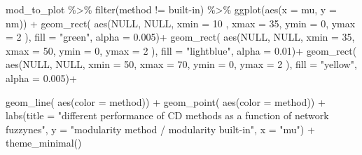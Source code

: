 \documentclass[
]{article}
\newenvironment{Shaded}{\begin{snugshade}}{\end{snugshade}}
\newcommand{\AttributeTok}[1]{\textcolor[rgb]{0.77,0.63,0.00}{#1}}
\newcommand{\ConstantTok}[1]{\textcolor[rgb]{0.00,0.00,0.00}{#1}}
\newcommand{\DecValTok}[1]{\textcolor[rgb]{0.00,0.00,0.81}{#1}}
\newcommand{\FloatTok}[1]{\textcolor[rgb]{0.00,0.00,0.81}{#1}}
\newcommand{\FunctionTok}[1]{\textcolor[rgb]{0.00,0.00,0.00}{#1}}
\newcommand{\NormalTok}[1]{#1}
\newcommand{\SpecialCharTok}[1]{\textcolor[rgb]{0.00,0.00,0.00}{#1}}
\newcommand{\StringTok}[1]{\textcolor[rgb]{0.31,0.60,0.02}{#1}}
\begin{document}
\begin{Shaded}
\begin{Highlighting}[]
\NormalTok{mod\_to\_plot }\SpecialCharTok{\%\textgreater{}\%} \FunctionTok{filter}\NormalTok{(method }\SpecialCharTok{!=} \StringTok{\textquotesingle{}built{-}in\textquotesingle{}}\NormalTok{) }\SpecialCharTok{\%\textgreater{}\%}
  \FunctionTok{ggplot}\NormalTok{(}\FunctionTok{aes}\NormalTok{(}\AttributeTok{x =}\NormalTok{ mu, }\AttributeTok{y =}\NormalTok{ nm)) }\SpecialCharTok{+}
  \FunctionTok{geom\_rect}\NormalTok{( }\FunctionTok{aes}\NormalTok{(}\ConstantTok{NULL}\NormalTok{, }\ConstantTok{NULL}\NormalTok{, }\AttributeTok{xmin =} \DecValTok{10}\NormalTok{ , }\AttributeTok{xmax =} \DecValTok{35}\NormalTok{, }\AttributeTok{ymin =} \DecValTok{0}\NormalTok{, }\AttributeTok{ymax =} \DecValTok{2}\NormalTok{ ), }\AttributeTok{fill =} \StringTok{"green"}\NormalTok{, }\AttributeTok{alpha =} \FloatTok{0.005}\NormalTok{)}\SpecialCharTok{+}
  \FunctionTok{geom\_rect}\NormalTok{( }\FunctionTok{aes}\NormalTok{(}\ConstantTok{NULL}\NormalTok{, }\ConstantTok{NULL}\NormalTok{, }\AttributeTok{xmin =} \DecValTok{35}\NormalTok{, }\AttributeTok{xmax =} \DecValTok{50}\NormalTok{, }\AttributeTok{ymin =} \DecValTok{0}\NormalTok{, }\AttributeTok{ymax =} \DecValTok{2}\NormalTok{ ), }\AttributeTok{fill =} \StringTok{"lightblue"}\NormalTok{, }\AttributeTok{alpha =} \FloatTok{0.01}\NormalTok{)}\SpecialCharTok{+}
  \FunctionTok{geom\_rect}\NormalTok{( }\FunctionTok{aes}\NormalTok{(}\ConstantTok{NULL}\NormalTok{, }\ConstantTok{NULL}\NormalTok{, }\AttributeTok{xmin =} \DecValTok{50}\NormalTok{, }\AttributeTok{xmax =} \DecValTok{70}\NormalTok{, }\AttributeTok{ymin =} \DecValTok{0}\NormalTok{, }\AttributeTok{ymax =} \DecValTok{2}\NormalTok{ ), }\AttributeTok{fill =} \StringTok{"yellow"}\NormalTok{, }\AttributeTok{alpha =} \FloatTok{0.005}\NormalTok{)}\SpecialCharTok{+}

  \FunctionTok{geom\_line}\NormalTok{( }\FunctionTok{aes}\NormalTok{(}\AttributeTok{color =}\NormalTok{ method)) }\SpecialCharTok{+}
  \FunctionTok{geom\_point}\NormalTok{( }\FunctionTok{aes}\NormalTok{(}\AttributeTok{color =}\NormalTok{ method)) }\SpecialCharTok{+} 
    \FunctionTok{labs}\NormalTok{(}\AttributeTok{title =} \StringTok{"different performance of CD methods as a function of network fuzzynes"}\NormalTok{, }\AttributeTok{y =} \StringTok{"modularity method / modularity built{-}in"}\NormalTok{, }\AttributeTok{x =} \StringTok{"mu"}\NormalTok{) }\SpecialCharTok{+}
    \FunctionTok{theme\_minimal}\NormalTok{()   }
\end{Highlighting}
\end{Shaded}
\end{document}
